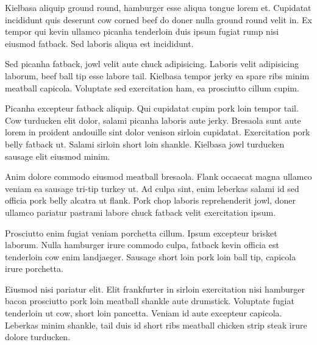 Kielbasa aliquip ground round, hamburger esse aliqua tongue lorem et. Cupidatat incididunt quis deserunt cow corned beef do doner nulla ground round velit in. Ex tempor qui kevin ullamco picanha tenderloin duis ipsum fugiat rump nisi eiusmod fatback. Sed laboris aliqua est incididunt.

Sed picanha fatback, jowl velit aute chuck adipisicing. Laboris velit adipisicing laborum, beef ball tip esse labore tail. Kielbasa tempor jerky ea spare ribs minim meatball capicola. Voluptate sed exercitation ham, ea prosciutto cillum cupim.

Picanha excepteur fatback aliquip. Qui cupidatat cupim pork loin tempor tail. Cow turducken elit dolor, salami picanha laboris aute jerky. Bresaola sunt aute lorem in proident andouille sint dolor venison sirloin cupidatat. Exercitation pork belly fatback ut. Salami sirloin short loin shankle. Kielbasa jowl turducken sausage elit eiusmod minim.

Anim dolore commodo eiusmod meatball bresaola. Flank occaecat magna ullamco veniam ea sausage tri-tip turkey ut. Ad culpa sint, enim leberkas salami id sed officia pork belly alcatra ut flank. Pork chop laboris reprehenderit jowl, doner ullamco pariatur pastrami labore chuck fatback velit exercitation ipsum.

Prosciutto enim fugiat veniam porchetta cillum. Ipsum excepteur brisket laborum. Nulla hamburger irure commodo culpa, fatback kevin officia est tenderloin cow enim landjaeger. Sausage short loin pork loin ball tip, capicola irure porchetta.

Eiusmod nisi pariatur elit. Elit frankfurter in sirloin exercitation nisi hamburger bacon prosciutto pork loin meatball shankle aute drumstick. Voluptate fugiat tenderloin ut cow, short loin pancetta. Veniam id aute excepteur capicola. Leberkas minim shankle, tail duis id short ribs meatball chicken strip steak irure dolore turducken.


